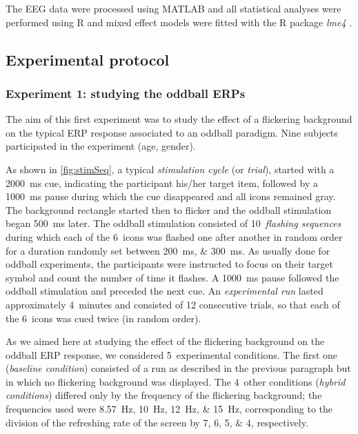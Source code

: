 \documentclass[10pt]{article}
\begin{document}
    The EEG data were processed using MATLAB\textsuperscript{\textregistered} and all statistical analyses were performed using R \parencite{R2013} and mixed effect models \parencite{Pinheiro2000} were fitted with the R package \emph{lme4} \parencite{lme42013}.


    \subsection{Experimental protocol}
    \label{sec:2.2Protocol}

        \subsubsection{Experiment 1: studying the oddball \acsp{ERP}}
        \label{sec:2.2.1ProtocolOddball}

        The aim of this first experiment was to study the effect of a flickering background on the typical \ac{ERP} response associated to an oddball paradigm.
        Nine subjects participated in the experiment (age, gender).

        As shown in \autoref{fig:stimSeq}, a typical \emph{stimulation cycle} (or \emph{trial}), started with a \SI{2000}{\ms} cue, indicating the participant his/her target item, followed by a \SI{1000}{\ms} pause during which the cue disappeared and all icons remained gray.
        The background rectangle started then to flicker and the oddball stimulation began \SI{500}{\ms} later.
        The oddball stimulation consisted of 10~\emph{flashing sequences} during which each of the 6~icons was flashed one after another in random order for a duration randomly set between \SIlist[list-units = single]{200;300}{\ms}.
        As usually done for oddball experiments, the participants were instructed to focus on their target symbol and count the number of time it flashes.
        A \SI{1000}{\ms} pause followed the oddball stimulation and preceded the next cue.
        An \emph{experimental run} lasted approximately 4~minutes and consisted of 12 consecutive trials, so that each of the 6~icons was cued twice (in random order).

        As we aimed here at studying the effect of the flickering background on the oddball \ac{ERP} response, we considered 5~experimental conditions.
        The first one (\emph{baseline condition}) consisted of a run as described in the previous paragraph but in which no flickering background was displayed.
        The 4~other conditions (\emph{hybrid conditions}) differed only by the frequency of the flickering background; the frequencies used were \SIlist[list-units = single]{8.57;10;12;15}{\Hz}, corresponding to the division of the refreshing rate of the screen by \numlist{7;6;5;4}, respectively.
\end{document}
